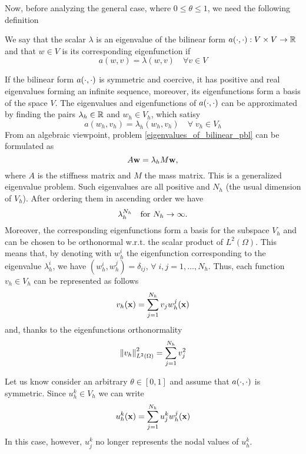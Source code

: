 Now, before analyzing the general case, where \(0 \leq \theta \leq 1\), we need the following definition 
\begin{definition}
    We say that the scalar \(\lambda\) is an eigenvalue of the bilinear form \(a(\cdot, \cdot): V \times V \to \mathbb{R}\) and that \(w \in V\) is its corresponding eigenfunction if 
    \[
        a(w,v) = \lambda(w,v) \quad \forall v \in V    
    \]
\end{definition}
If the bilinear form \(a(\cdot, \cdot)\) is symmetric and coercive, it has positive and real eigenvalues forming an infinite sequence, moreover, its eigenfunctions form a basis of the space \(V\). The eigenvalues and eigenfunctions of \(a(\cdot, \cdot)\) can be approximated by finding the pairs \(\lambda_h \in \mathbb{R}\) and \(w_h \in V_h\), which satisy 
\begin{equation}
    a(w_h, v_h) = \lambda_h (w_h, v_h) \quad \forall \; v_h \in V_h
    \label{eigenvalues_of_bilinear_pbl}
\end{equation}
From an algebraic viewpoint, problem \eqref{eigenvalues_of_bilinear_pbl} can be formulated as 
\[
    A\textbf{w} = \lambda_h M \textbf{w},
\]
where \(A\) is the stiffness matrix and \(M\) the mass matrix. This is a generalized eigenvalue problem. Such eigenvalues are all positive and \(N_h\) (the usual dimension of \(V_h\)). After ordering them in ascending order we have
\[
    \lambda_h^{N_h} \quad \text{for } N_h \to \infty.
\]
Moreover, the corresponding eigenfunctions form a basis for the subspace \(V_h\) and can be chosen to be orthonormal w.r.t. the scalar product of \(L^2(\Omega)\). This means that, by denoting with \(w^i_h\) the eigenfunction corresponding to the eigenvalue \(\lambda^i_h\), we have \((w^i_h, w_h^j) = \delta_{ij}\), \(\forall \; i,j = 1,\ldots,N_h\). Thus, each function \(v_h \in V_h\) can be represented as follows 
\[
    v_h(\textbf{x}) = \sum_{j=1}^{N_h} v_j w^j_h(\textbf{x})
\]
and, thanks to the eigenfunctions orthonormality
\begin{equation}
    \norm{v_h}_{L^2(\Omega)}^2 = \sum_{j=1}^{N_h} v_j^2
    \label{orthonormality_pbl}
\end{equation}

Let us know consider an arbitrary \(\theta \in [0,1]\) and assume that \(a(\cdot, \cdot)\) is symmetric. Since \(u_h^k \in V_h\) we can write 
\[
    u_h^k(\textbf{x}) = \sum_{j=1}^{N_h} u^k_j w^j_h(\textbf{x})
\]
In this case, however, \(u_j^k\) no longer represents the nodal values of \(u_h^k\).

